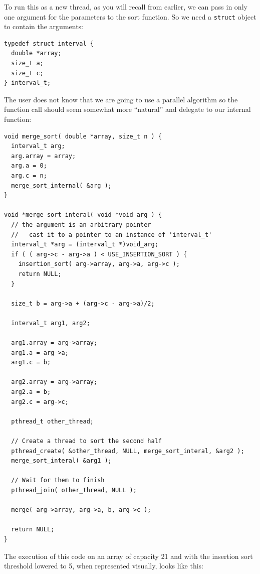To run this as a new thread, as you will recall from earlier, we can pass in only one argument for the parameters to the sort function. So we need a \texttt{struct} object to contain the arguments:

\begin{verbatim}
typedef struct interval {
  double *array;
  size_t a;
  size_t c;
} interval_t;
\end{verbatim}

The user does not know that we are going to use a parallel algorithm so the function call should seem somewhat more ``natural'' and delegate to our internal function: 

\begin{verbatim}
void merge_sort( double *array, size_t n ) {
  interval_t arg;
  arg.array = array;
  arg.a = 0;
  arg.c = n;
  merge_sort_internal( &arg );
}

void *merge_sort_interal( void *void_arg ) {
  // the argument is an arbitrary pointer
  //   cast it to a pointer to an instance of 'interval_t'
  interval_t *arg = (interval_t *)void_arg;
  if ( ( arg->c - arg->a ) < USE_INSERTION_SORT ) {
    insertion_sort( arg->array, arg->a, arg->c );
    return NULL;
  }
  
  size_t b = arg->a + (arg->c - arg->a)/2;
  
  interval_t arg1, arg2;
  
  arg1.array = arg->array;
  arg1.a = arg->a;
  arg1.c = b;
  
  arg2.array = arg->array;
  arg2.a = b;
  arg2.c = arg->c;
  
  pthread_t other_thread;

  // Create a thread to sort the second half
  pthread_create( &other_thread, NULL, merge_sort_interal, &arg2 ); 
  merge_sort_interal( &arg1 );
  
  // Wait for them to finish
  pthread_join( other_thread, NULL );

  merge( arg->array, arg->a, b, arg->c );

  return NULL;
}
\end{verbatim}

The execution of this code on an array of capacity 21 and with the insertion sort threshold lowered to 5, when represented visually, looks like this:

